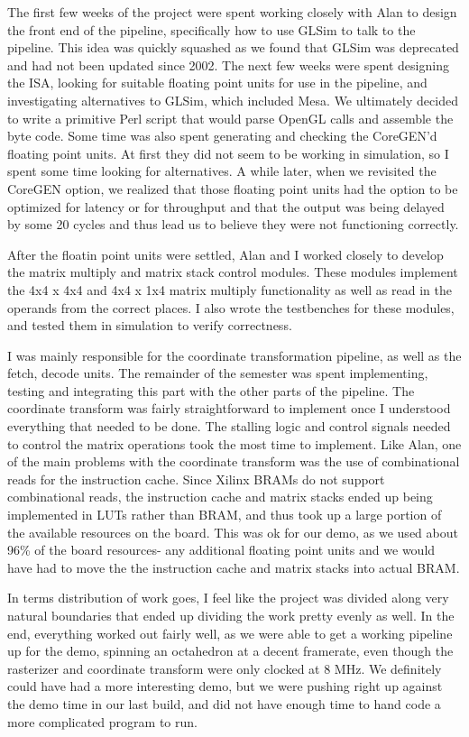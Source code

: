 \documentclass[letterpaper,10pt]{article}
\begin{document}
The first few weeks of the project were spent working closely with Alan to design the front end of the pipeline, specifically how to use GLSim to talk to the pipeline. This idea was quickly squashed as we found that GLSim was deprecated and had not been updated since 2002. The next few weeks were spent designing the ISA, looking for suitable floating point units for use in the pipeline, and investigating alternatives to GLSim, which included Mesa. We ultimately decided to write a primitive Perl script that would parse OpenGL calls and assemble the byte code. Some time was also spent generating and checking the CoreGEN'd floating point units. At first they did not seem to be working in simulation, so I spent some time looking for alternatives. A while later, when we revisited the CoreGEN option, we realized that those floating point units had the option to be optimized for latency or for throughput and that the output was being delayed by some 20 cycles and thus lead us to believe they were not functioning correctly.

After the floatin point units were settled, Alan and I worked closely to develop the matrix multiply and matrix stack control modules. These modules implement the 4x4 x 4x4 and 4x4 x 1x4 matrix multiply functionality as well as read in the operands from the correct places. I also wrote the testbenches for these modules, and tested them in simulation to verify correctness.

I was mainly responsible for the coordinate transformation pipeline, as well as the fetch, decode units. The remainder of the semester was spent implementing, testing and integrating this part with the other parts of the pipeline. The coordinate transform was fairly straightforward to implement once I understood everything that needed to be done. The stalling logic and control signals needed to control the matrix operations took the most time to implement. Like Alan, one of the main problems with the coordinate transform was the use of combinational reads for the instruction cache. Since Xilinx BRAMs do not support combinational reads, the instruction cache and matrix stacks ended up being implemented in LUTs rather than BRAM, and thus took up a large portion of the available resources on the board. This was ok for our demo, as we used about 96\% of the board resources- any additional floating point units and we would have had to move the the instruction cache and matrix stacks into actual BRAM.

In terms distribution of work goes, I feel like the project was divided along very natural boundaries that ended up dividing the work pretty evenly as well. In the end, everything worked out fairly well, as we were able to get a working pipeline up for the demo, spinning an octahedron at a decent framerate, even though the rasterizer and coordinate transform were only clocked at 8 MHz. We definitely could have had a more interesting demo, but we were pushing right up against the demo time in our last build, and did not have enough time to hand code a more complicated program to run.
\end{document}
